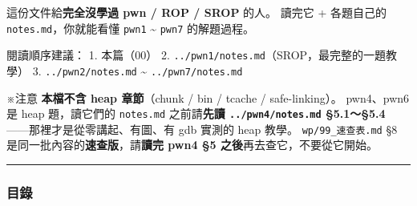 \documentclass[10pt,a4paper]{article}
\renewenvironment{quote}{%
  \begin{mdframed}[linewidth=0pt,innerleftmargin=0pt,innerrightmargin=0pt,
    innerbottommargin=0pt,innertopmargin=0pt,skipabove=0.55em,skipbelow=0.55em,
    leftmargin=0.9em,rightmargin=0.4em,startcode={\color{quotebar}\vrule width 2.6pt},%
    endcode={}]%
  \itshape\color{black}%
}{%
  \end{mdframed}%
}
\begin{document}
\begin{quote}
這份文件給\textbf{完全沒學過 pwn / ROP / SROP} 的人。 讀完它 +
各題自己的 \texttt{notes.\allowbreak{}md}，你就能看懂 \texttt{pwn1} \textasciitilde{}
\texttt{pwn7} 的解題過程。

閱讀順序建議： 1. 本篇（00） 2.
\texttt{../\allowbreak{}pwn1/\allowbreak{}notes.\allowbreak{}md}（SROP，最完整的一題教學） 3.
\texttt{../\allowbreak{}pwn2/\allowbreak{}notes.\allowbreak{}md} \textasciitilde{} \texttt{../\allowbreak{}pwn7/\allowbreak{}notes.\allowbreak{}md}

※注意 \textbf{本檔不含 heap 章節}（chunk / bin / tcache /
safe-linking）。 pwn4、pwn6 是 heap 題，讀它們的 \texttt{notes.\allowbreak{}md}
之前請\textbf{先讀 \texttt{../\allowbreak{}pwn4/\allowbreak{}notes.\allowbreak{}md} §5.1～§5.4}
------那裡才是從零講起、有圖、有 gdb 實測的 heap 教學。
\texttt{wp/\allowbreak{}99\_\allowbreak{}速查表.\allowbreak{}md} §8
是同一批內容的\textbf{速查版}，請\textbf{讀完 pwn4 §5
之後}再去查它，不要從它開始。
\end{quote}

\begin{center}\rule{0.5\linewidth}{0.5pt}\end{center}

\subsubsection{目錄}\label{ux76eeux9304}
\end{document}
